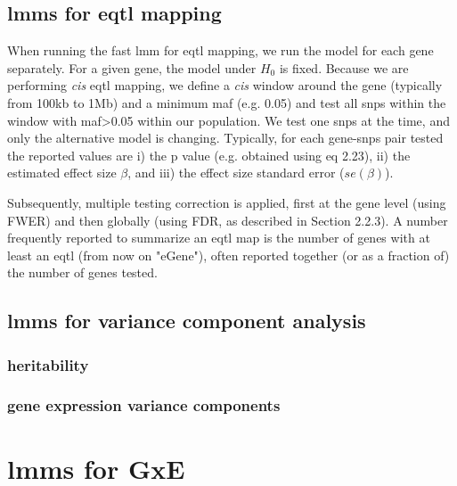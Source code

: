 \subsection{\gls{lmm}s for \gls{eqtl} mapping}

When running the fast \gls{lmm} for e\gls{qtl} mapping, we run the model for each gene separately.
For a given gene, the model under $H_0$ is fixed.
Because we are performing \textit{cis} \gls{eqtl} mapping, we define a \textit{cis} window around the gene (typically from 100kb to 1Mb) and a minimum \gls{maf} (e.g. 0.05) and test all \gls{snps} within the window with \gls{maf}>0.05 within our population.  
We test one \gls{snps} at the time, and only the alternative model is changing.
Typically, for each gene-\gls{snps} pair tested the reported values are i) the p value (e.g. obtained using eq 2.23), ii) the estimated effect size $\beta$, and iii) the effect size standard error ($se(\beta)$).


Subsequently, multiple testing correction is applied, first at the gene level (using FWER) and then globally (using FDR, as described in Section 2.2.3).
A number frequently reported to summarize an e\gls{qtl} map is the number of genes with at least an e\gls{qtl} (from now on "eGene"), often reported together (or as a fraction of) the number of genes tested.

\subsection{\gls{lmm}s for variance component analysis}

\subsubsection{heritability}

\subsubsection{gene expression variance components}

\newpage 


\section{\gls{lmm}s for GxE}

